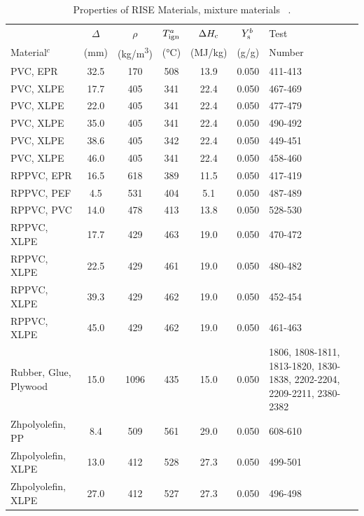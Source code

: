 \clearpage

\begin{table}[!ht]
\caption[Properties of RISE Materials, mixture materials]{Properties of RISE Materials, mixture materials ~\cite{RISE:Fire_Database}.}
\centering
\begin{tabular}{|l|c|c|c|c|c|p{3.7cm}|}
\hline
                & $\Delta$ & $\rho$     & $T_{\rm{ign}}^{a}$  & $\Delta H_{\rm c}$  & $Y_{\rm s}^{b}$ & Test    \\
Material$^{c}$  & (mm)     & (\unit{kg/m^3}) & (\unit{\degreeCelsius})         & (MJ/kg)             & (g/g)           & Number  \\ \hline
\hline
PVC, EPR                                          & 32.5 & 170 & 508 & 13.9 & 0.050 & 411-413 \\\hline
PVC, XLPE                                         & 17.7 & 405 & 341 & 22.4 & 0.050 & 467-469 \\\hline
PVC, XLPE                                         & 22.0 & 405 & 341 & 22.4 & 0.050 & 477-479 \\\hline
PVC, XLPE                                         & 35.0 & 405 & 341 & 22.4 & 0.050 & 490-492 \\\hline
PVC, XLPE                                         & 38.6 & 405 & 342 & 22.4 & 0.050 & 449-451 \\\hline
PVC, XLPE                                         & 46.0 & 405 & 341 & 22.4 & 0.050 & 458-460 \\\hline
RPPVC, EPR                                        & 16.5 & 618 & 389 & 11.5 & 0.050 & 417-419 \\\hline
RPPVC, PEF                                        & 4.5 & 531 & 404 & 5.1 & 0.050 & 487-489 \\\hline
RPPVC, PVC                                        & 14.0 & 478 & 413 & 13.8 & 0.050 & 528-530 \\\hline
RPPVC, XLPE                                       & 17.7 & 429 & 463 & 19.0 & 0.050 & 470-472 \\\hline
RPPVC, XLPE                                       & 22.5 & 429 & 461 & 19.0 & 0.050 & 480-482 \\\hline
RPPVC, XLPE                                       & 39.3 & 429 & 462 & 19.0 & 0.050 & 452-454 \\\hline
RPPVC, XLPE                                       & 45.0 & 429 & 462 & 19.0 & 0.050 & 461-463 \\\hline
Rubber, Glue, Plywood                             & 15.0 & 1096 & 435 & 15.0 & 0.050 & 1806, 1808-1811, 1813-1820, 1830-1838, 2202-2204, 2209-2211, 2380-2382 \\\hline
Zhpolyolefin, PP                                  & 8.4 & 509 & 561 & 29.0 & 0.050 & 608-610 \\\hline
Zhpolyolefin, XLPE                                & 13.0 & 412 & 528 & 27.3 & 0.050 & 499-501 \\\hline
Zhpolyolefin, XLPE                                & 27.0 & 412 & 527 & 27.3 & 0.050 & 496-498 \\\hline
\end{tabular}
\label{Properties_RISE_Materials_Mixtures2}
\end{table}
